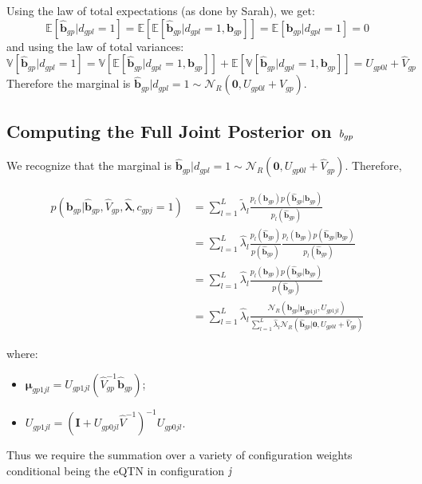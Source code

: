 \documentclass[10pt]{article}
\newcommand{\Exp}{\mathbb{E}} %
\newcommand{\Var}{\mathbb{V}} %
\newcommand{\Norm}{{\mathcal{N}}} %
\begin{document}
Using the law of total expectations (as done by Sarah), we get:
\begin{equation}
  \Exp[\hat{\bm{b}}_{gp} | d_{gpl}=1] = \Exp[\Exp[\hat{\bm{b}}_{gp} | d_{gpl}=1, \bm{b}_{gp}]] = \Exp[\bm{b}_{gp} | d_{gpl}=1] = 0
\end{equation}
and using the law of total variances:
\begin{equation}
  \Var[\hat{\bm{b}}_{gp} | d_{gpl}=1] = \Var[\Exp[\hat{\bm{b}}_{gp} | d_{gpl}=1, \bm{b}_{gp}]] + \Exp[\Var[\hat{\bm{b}}_{gp} | d_{gpl}=1, \bm{b}_{gp}]] = U_{gp0l} + \hat{V}_{gp}
\end{equation}
Therefore the marginal is $\hat{\bm{b}}_{gp} | d_{gpl}=1 \sim \Norm_R(\bm{0}, U_{gp0l} + \hat{V}_{gp})$.

\subsection{Computing the Full Joint Posterior on $\emph{b}_{gp}$}

We recognize that the marginal is $\hat{\bm{b}}_{gp} | d_{gpl}=1 \sim \Norm_R(\bm{0}, U_{gp0l} + \hat{V}_{gp})$.
Therefore, 

\begin{equation}
  \begin{aligned} 
  p(\bm{b}_{gp} | \hat{\bm{b}}_{gp}, \hat{V}_{gp}, \hat{\bm{\lambda}}, c_{gpj}=1)  &= \sum_{l=1}^L \tilde{\lambda}_l \frac{p_l(\bm{b}_{gp}) p(\hat{\bm{b}}_{gp} | \bm{b}_{gp})}{p_l(\hat{\bm{b}}_{gp})}\\
      &= \sum_{l=1}^L \hat{\lambda}_l \frac{p_l(\hat{\bm{b}}_{gp})}{p(\hat{\bm{b}}_{gp})} \frac{p_l(\bm{b}_{gp}) p(\hat{\bm{b}}_{gp} | \bm{b}_{gp})}{p_l(\hat{\bm{b}}_{gp})}\\
      &= \sum_{l=1}^L \hat{\lambda}_l \frac{p_l(\bm{b}_{gp}) p(\hat{\bm{b}}_{gp} | \bm{b}_{gp})}{{p(\hat{\bm{b}}_{gp})}} \\
      &=  \sum_{l=1}^L \hat{\lambda}_l  \frac { \Norm_R(\bm{b}_{gp}|\bm{\mu}_{gp1jl}, U_{gp1jl})} {\sum_{l=1}^L \hat{\lambda}_l \Norm_R(\hat{\bm{b}}_{gp}|\bm{0}, U_{gp0l} + \hat{V}_{gp})}
       \end{aligned} 
       \end{equation}
 
where:
\begin{itemize}
\item $\bm{\mu}_{gp1jl} = U_{gp1jl} (\hat{V}_{gp}^{-1} \hat{\bm{b}}_{gp})$;
\item $U_{gp1jl} = (\mathbf{I} +U_{gp0jl} \hat{V}^{-1})^{-1} U_{gp0jl}$.


\end{itemize}

Thus we require the summation over a variety of configuration weights conditional being the eQTN in configuration $\emph{j}$

\end{document}
